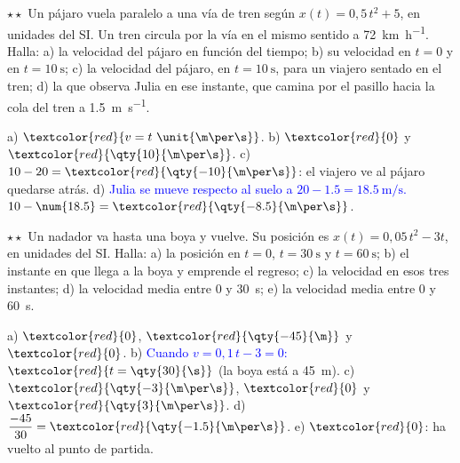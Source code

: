 \begin{exercise}
    \(\star\star\) Un pájaro vuela paralelo a una vía de tren según \(x(t) = 0{,}5\,t^2 + 5\), en unidades del SI. Un tren
    circula por la vía en el mismo sentido a \qty{72}{\km\per\hour}. Halla: a) la velocidad del pájaro en función del tiempo;
    b) su velocidad en \(t = 0\) y en \(t = \qty{10}{\s}\); c) la velocidad del pájaro, en \(t = \qty{10}{\s}\), para un viajero
    sentado en el tren; d) la que observa Julia en ese instante, que camina por el pasillo hacia la cola del tren a
    \qty{1.5}{\m\per\s}.
    \begin{solu}
        a) \(\textcolor{red}{v = t~\unit{\m\per\s}}\). b) \(\textcolor{red}{0}\) y \(\textcolor{red}{\qty{10}{\m\per\s}}\).
        c) \(10 - 20 = \textcolor{red}{\qty{-10}{\m\per\s}}\): el viajero ve al pájaro quedarse atrás.
        d) \textcolor{blue}{Julia se mueve respecto al suelo a \(20 - \num{1.5} = \qty{18.5}{\m\per\s}\).}
        \(10 - \num{18.5} = \textcolor{red}{\qty{-8.5}{\m\per\s}}\).
    \end{solu}
\end{exercise}

\begin{exercise}
    \(\star\star\) Un nadador va hasta una boya y vuelve. Su posición es \(x(t) = 0{,}05\,t^2 - 3t\), en unidades del SI. Halla:
    a) la posición en \(t = 0\), \(t = \qty{30}{\s}\) y \(t = \qty{60}{\s}\); b) el instante en que llega a la boya y emprende el
    regreso; c) la velocidad en esos tres instantes; d) la velocidad media entre 0 y \qty{30}{\s}; e) la velocidad media entre 0 y
    \qty{60}{\s}.
    \begin{solu}
        a) \(\textcolor{red}{0}\), \(\textcolor{red}{\qty{-45}{\m}}\) y \(\textcolor{red}{0}\). b) \textcolor{blue}{Cuando \(v = 0{,}1\,t - 3 = 0\):}
        \(\textcolor{red}{t = \qty{30}{\s}}\) (la boya está a \qty{45}{\m}). c) \(\textcolor{red}{\qty{-3}{\m\per\s}}\), \(\textcolor{red}{0}\)
        y \(\textcolor{red}{\qty{3}{\m\per\s}}\). d) \(\dfrac{-45}{30} = \textcolor{red}{\qty{-1.5}{\m\per\s}}\). e) \(\textcolor{red}{0}\):
        ha vuelto al punto de partida.
    \end{solu}
\end{exercise}

